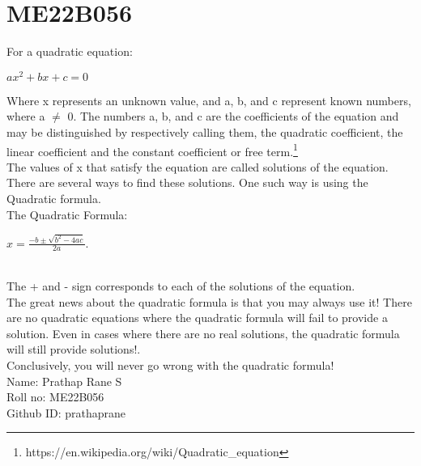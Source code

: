 \section{ME22B056}


For a quadratic equation:
                
               \begin{center}
            \(ax^2 + bx + c =0\)   
               \end{center} 
                

Where x represents an unknown value, and a, b, and c represent known numbers, where a $\neq$ 0.
The numbers a, b, and c are the coefficients of the equation and may be distinguished by respectively calling them, the quadratic coefficient, the linear coefficient and the constant coefficient or free term.\footnote{ https://en.wikipedia.org/wiki/Quadratic\_equation }\\


The values of x that satisfy the equation are called solutions of the equation. There are several ways to find these solutions. One such way is using the Quadratic formula.\\

The Quadratic Formula:
    \begin{center}
            \(x=\frac{-b \pm \sqrt{b^2-4ac}}{2a}.\)   
               \end{center} \\

The + and - sign corresponds to each of the solutions of the equation.\\[\baselineskip]

The great news about the quadratic formula is that you may always use it! There are no quadratic equations where the quadratic formula will fail to provide a solution. Even in cases where there are no real solutions, the quadratic formula will still provide solutions!.\\


Conclusively, you will never go wrong with the quadratic formula!\\

Name: Prathap Rane S\\


Roll no: ME22B056\\


Github ID: prathaprane
